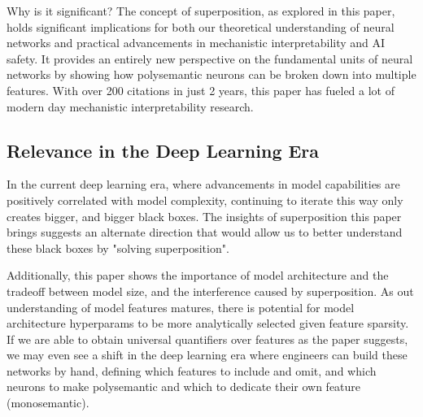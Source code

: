 Why is it significant?
The concept of superposition, as explored in this paper, holds significant implications for both our theoretical understanding of neural networks and practical advancements in mechanistic interpretability and AI safety.
It provides an entirely new perspective on the fundamental units of neural networks by showing how polysemantic neurons can be broken down into multiple features.
With over 200 citations in just 2 years, this paper has fueled a lot of modern day mechanistic interpretability research.

%
%

\subsection{Relevance in the Deep Learning Era}

In the current deep learning era, where advancements in model capabilities are positively correlated with model complexity, continuing to iterate this way only creates bigger, and bigger black boxes.
The insights of superposition this paper brings suggests an alternate direction that would allow us to better understand these black boxes by "solving superposition".

Additionally, this paper shows the importance of model architecture and the tradeoff between model size, and the interference caused by superposition.
As out understanding of model features matures, there is potential for model architecture hyperparams to be more analytically selected given feature sparsity.
If we are able to obtain universal quantifiers over features as the paper suggests, we may even see a shift in the deep learning era where engineers can build these networks by hand, defining which features to include and omit, and which neurons to make polysemantic and which to dedicate their own feature (monosemantic).

